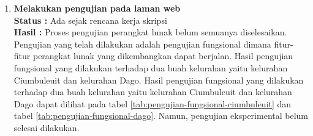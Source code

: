 \documentclass[a4paper,twoside]{article}
\begin{document}
\begin{enumerate}
		\item \textbf{Melakukan pengujian pada laman web}\\
		{\bf Status :} Ada sejak rencana kerja skripsi \\
		{\bf Hasil :} Proses pengujian perangkat  lunak belum semuanya diselesaikan. Pengujian yang telah dilakukan adalah pengujian fungsional dimana fitur-fitur perangkat lunak yang dikembangkan dapat berjalan.  Hasil pengujian fungsional yang dilakukan terhadap dua buah kelurahan yaitu kelurahan Ciumbuleuit dan kelurahan Dago. Hasil pengujian fungsional yang dilakukan terhadap dua buah kelurahan yaitu kelurahan Ciumbuleuit dan kelurahan Dago dapat dilihat pada tabel \ref{tab:pengujian-fungsional-ciumbuleuit} dan tabel \ref{tab:pengujian-fungsional-dago}. Namun, pengujian eksperimental belum selesai dilakukan.
		\begin{table}[H]
			\centering
			\caption{Pengujian Fungsional Kelurahan Ciumbuleuit}
			\label{tab:pengujian-fungsional-ciumbuleuit}
\end{table}
\end{enumerate}
\end{document}
